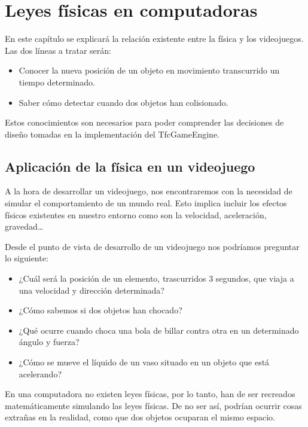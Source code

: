\chapter{Leyes físicas en computadoras}

En este capítulo se explicará la relación existente entre la física y los videojuegos. Las dos líneas a tratar serán:
\begin{itemize}
\item Conocer la nueva posición de un objeto en movimiento transcurrido un tiempo determinado.
\item Saber cómo detectar cuando dos objetos han colisionado.
\end{itemize}

Estos conocimientos son necesarios para poder comprender las decisiones de diseño tomadas en la implementación del TfcGameEngine.

\newpage


\section{Aplicación de la física en un videojuego}

A la hora de desarrollar un videojuego, nos encontraremos con la necesidad de simular el comportamiento de un mundo real. Esto implica incluir los efectos físicos existentes en nuestro entorno como son la velocidad, aceleración, gravedad\ldots
\newline 

Desde el punto de vista de desarrollo de un videojuego nos podríamos preguntar lo siguiente:
\begin{itemize}
\item ¿Cuál será la posición de un elemento, trascurridos 3 segundos, que viaja a una velocidad y dirección determinada?
\item ¿Cómo sabemos si dos objetos han chocado?
\item ¿Qué ocurre cuando choca una bola de billar contra otra en un determinado ángulo y fuerza?
\item ¿Cómo se mueve el líquido de un vaso situado en un objeto que está acelerando? 
\end{itemize}

En una computadora no existen leyes físicas, por lo tanto, han de ser recreados matemáticamente simulando las leyes físicas. De no ser así, podrían ocurrir cosas extrañas en la realidad, como que dos objetos ocuparan el mismo espacio.
\newline

